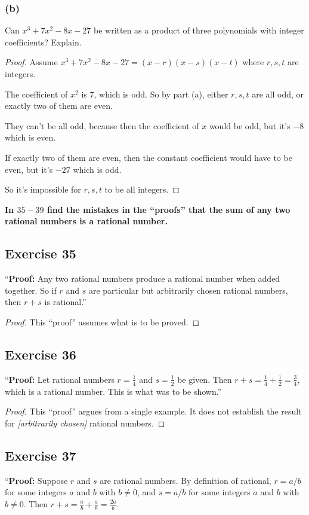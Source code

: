 \documentclass[14pt]{extarticle}
\newcommand{\dps}{\displaystyle}
\newcommand{\cy}{\color{cyan}}
\begin{document}
\subsubsection{(b)}
Can $x^3 + 7x^2 - 8x - 27$ be written as a product of three polynomials with integer coefficients? Explain.

\begin{proof}
Assume $x^3 + 7x^2 - 8x - 27 = (x-r)(x-s)(x-t)$ where $r,s,t$ are integers.

The coefficient of $x^2$ is 7, which is odd. So by part (a), either $r,s,t$ are all odd, or exactly two of them are even.

They can't be all odd, because then the coefficient of $x$ would be odd, but it's $-8$ which is even.

If exactly two of them are even, then the constant coefficient would have to be even, but it's $-27$ which is odd.

So it's impossible for $r,s,t$ to be all integers.
\end{proof}

{\bf \cy In $35-39$ find the mistakes in the “proofs” that the sum of any two rational numbers is a rational number.}

\subsection{Exercise 35}
“{\bf Proof:} Any two rational numbers produce a rational number when added together. So if $r$ and $s$ are particular but arbitrarily chosen rational numbers, then $r + s$ is rational.”

\begin{proof}
This “proof” assumes what is to be proved.
\end{proof}

\subsection{Exercise 36}
“{\bf Proof:} Let rational numbers $r = \frac{1}{4}$ and $s = \frac{1}{2}$ be given. Then $r + s = \frac{1}{4} + \frac{1}{2} = \frac{3}{4}$, which is a rational number. This is what was to be shown.”

\begin{proof}
This “proof” argues from a single example. It does not establish the result for {\it[arbitrarily chosen]} rational numbers.
\end{proof}

\subsection{Exercise 37}
“{\bf Proof:} Suppose $r$ and $s$ are rational numbers. By
definition of rational, $r = a/b$ for some integers $a$ and $b$ with $b \neq 0$, and $s = a/b$ for some integers $a$ and $b$ with $b \neq 0$. Then $r+s = \dps\frac{a}{b} + \frac{a}{b} = \frac{2a}{b}$.
\end{document}
